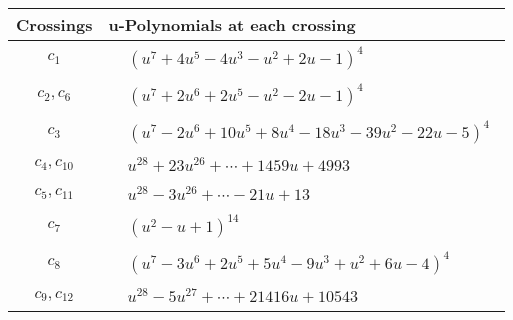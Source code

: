 \documentclass[1p]{elsarticle_modified}
\theoremstyle{definition}
\begin{document}
\begin{tabular}{m{50pt}|m{274pt}}
Crossings & \hspace{64pt}u-Polynomials at each crossing \\
\hline $$\begin{aligned}c_{1}\end{aligned}$$&$\begin{aligned}
&(u^7+4 u^5-4 u^3- u^2+2 u-1)^4
\end{aligned}$\\
\hline $$\begin{aligned}c_{2},c_{6}\end{aligned}$$&$\begin{aligned}
&(u^7+2 u^6+2 u^5- u^2-2 u-1)^4
\end{aligned}$\\
\hline $$\begin{aligned}c_{3}\end{aligned}$$&$\begin{aligned}
&(u^7-2 u^6+10 u^5+8 u^4-18 u^3-39 u^2-22 u-5)^4
\end{aligned}$\\
\hline $$\begin{aligned}c_{4},c_{10}\end{aligned}$$&$\begin{aligned}
&u^{28}+23 u^{26}+\cdots+1459 u+4993
\end{aligned}$\\
\hline $$\begin{aligned}c_{5},c_{11}\end{aligned}$$&$\begin{aligned}
&u^{28}-3 u^{26}+\cdots-21 u+13
\end{aligned}$\\
\hline $$\begin{aligned}c_{7}\end{aligned}$$&$\begin{aligned}
&(u^2- u+1)^{14}
\end{aligned}$\\
\hline $$\begin{aligned}c_{8}\end{aligned}$$&$\begin{aligned}
&(u^7-3 u^6+2 u^5+5 u^4-9 u^3+u^2+6 u-4)^4
\end{aligned}$\\
\hline $$\begin{aligned}c_{9},c_{12}\end{aligned}$$&$\begin{aligned}
&u^{28}-5 u^{27}+\cdots+21416 u+10543
\end{aligned}$\\
\hline
\end{tabular}\\~\\
\end{document}

